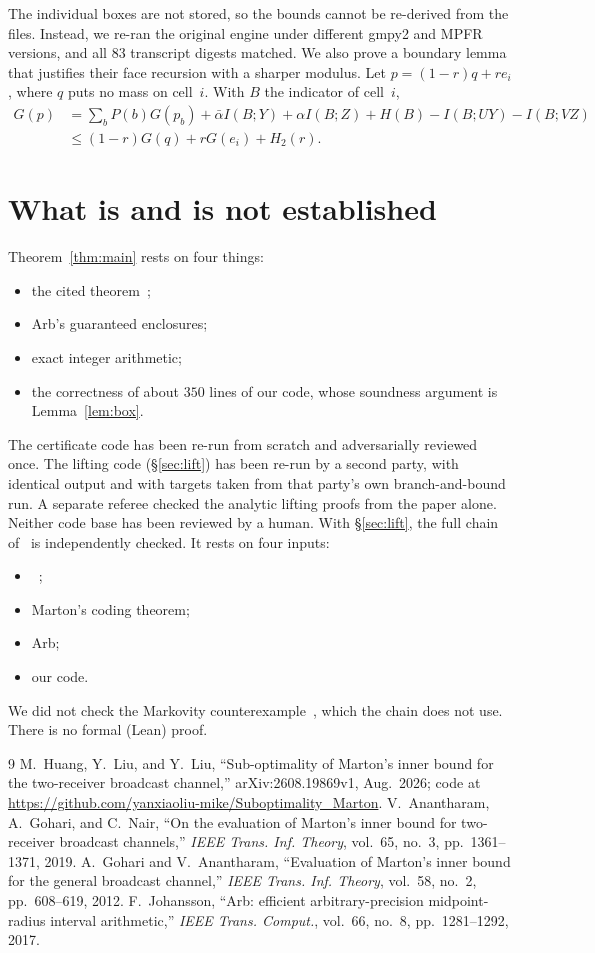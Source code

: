 \documentclass[11pt,draftclsnofoot,onecolumn,journal]{IEEEtran}
\newcommand{\ab}{\bar\alpha}
\begin{document}
The individual boxes are not stored, so the bounds cannot be re-derived from the files. Instead,
we re-ran the original engine under different gmpy2 and MPFR versions, and all $83$ transcript
digests matched. We also prove a boundary lemma that justifies their face recursion with a
sharper modulus. Let $p=(1-r)q+re_i$, where $q$ puts no mass on cell~$i$. With $B$ the indicator of
cell~$i$,
\begin{align*}
G(p)&=\textstyle\sum_bP(b)G(p_b)+\ab I(B;Y)+\alpha I(B;Z)+H(B)-I(B;UY)-I(B;VZ)\\
&\le(1-r)G(q)+rG(e_i)+H_2(r).
\end{align*}

\section{What is and is not established}

Theorem~\ref{thm:main} rests on four things:
\begin{itemize}
\item the cited theorem~\cite[Thm.~3]{AGN};
\item Arb's guaranteed enclosures;
\item exact integer arithmetic;
\item the correctness of about $350$ lines of our code, whose soundness argument is
Lemma~\ref{lem:box}.
\end{itemize}
The certificate code has been re-run from scratch and adversarially reviewed once. The
lifting code (\S\ref{sec:lift}) has been re-run by a second party, with identical output and with
targets taken from that party's own branch-and-bound run. A separate referee checked the
analytic lifting proofs from the paper alone. Neither code base has been reviewed by a human.
With \S\ref{sec:lift}, the full chain of~\cite{HLL} is independently checked. It rests on
four inputs:
\begin{itemize}
\item~\cite[Thm.~3]{AGN};
\item Marton's coding theorem;
\item Arb;
\item our code.
\end{itemize}
We did not check the Markovity counterexample~\cite[(20)--(21)]{HLL}, which the chain does not
use. There is no formal (Lean) proof.

\begin{thebibliography}{9}
 M.~Huang, Y.~Liu, and Y.~Liu, ``Sub-optimality of Marton's inner bound for the
two-receiver broadcast channel,'' arXiv:2608.19869v1, Aug.~2026; code at
\url{https://github.com/yanxiaoliu-mike/Suboptimality_Marton}.
 V.~Anantharam, A.~Gohari, and C.~Nair, ``On the evaluation of Marton's inner bound
for two-receiver broadcast channels,'' \emph{IEEE Trans. Inf. Theory}, vol.~65, no.~3,
pp.~1361--1371, 2019.
 A.~Gohari and V.~Anantharam, ``Evaluation of Marton's inner bound for the general
broadcast channel,'' \emph{IEEE Trans. Inf. Theory}, vol.~58, no.~2, pp.~608--619, 2012.
 F.~Johansson, ``Arb: efficient arbitrary-precision midpoint-radius interval
arithmetic,'' \emph{IEEE Trans. Comput.}, vol.~66, no.~8, pp.~1281--1292, 2017.
\end{thebibliography}
\end{document}
